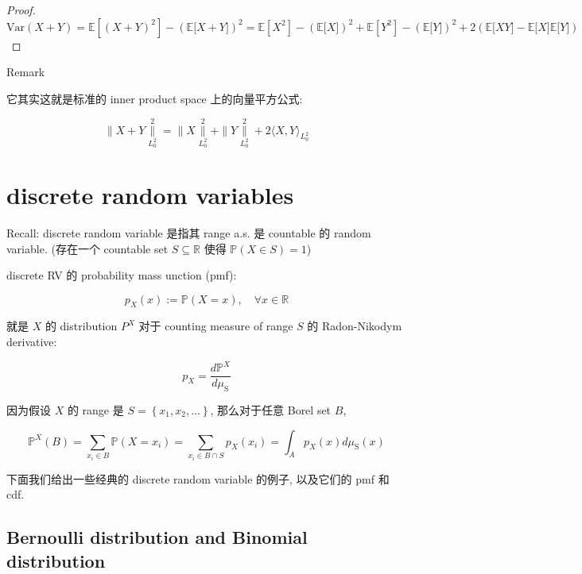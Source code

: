 \documentclass{qlnotes-export}
\begin{document}
\begin{proof}

\[\text{Var}(X + Y) = {\mathbb{E}}\left\lbrack {(X + Y)^{2}} \right\rbrack - ({\mathbb{E}}\lbrack X + Y\rbrack)^{2} = {\mathbb{E}}\left\lbrack X^{2} \right\rbrack - ({\mathbb{E}}\lbrack X\rbrack)^{2} + {\mathbb{E}}\left\lbrack Y^{2} \right\rbrack - ({\mathbb{E}}\lbrack Y\rbrack)^{2} + 2({\mathbb{E}}\lbrack XY\rbrack - {\mathbb{E}}\lbrack X\rbrack{\mathbb{E}}\lbrack Y\rbrack)\]

\end{proof}

\begin{qlremark}{Remark}

它其实这就是标准的 inner product space 上的向量平方公式:

\[\parallel X + Y\underset{L_{0}^{2}}{\overset{2}{\parallel}} = \parallel X\underset{L_{0}^{2}}{\overset{2}{\parallel}} + \parallel Y\underset{L_{0}^{2}}{\overset{2}{\parallel}} + 2\langle X,Y\rangle_{L_{0}^{2}}\]

\end{qlremark}

\section{discrete random variables}\label{discrete-random-variables}

Recall: discrete random variable 是指其 range a.s. 是 countable 的 random variable. (存在一个 countable set \(S \subseteq {\mathbb{R}}\) 使得 \({\mathbb{P}}(X \in S) = 1\))

discrete RV 的 probability mass unction (pmf):

\[p_{X}(x) := {\mathbb{P}}(X = x),\quad\forall x \in {\mathbb{R}}\]

就是 \(X\) 的 distribution \(P^{X}\) 对于 counting measure of range \(S\) 的 Radon-Nikodym derivative:

\[p_{X} = \frac{d{\mathbb{P}}^{X}}{d\mu_{\text{S}}}\]

因为假设 \(X\) 的 range 是 \(S = \left\{ {x_{1},x_{2},\ldots} \right\}\), 那么对于任意 Borel set \(B\),

\[{\mathbb{P}}^{X}(B) = \sum\limits_{x_{i} \in B}{\mathbb{P}}(X = x_{i}) = \sum\limits_{x_{i} \in B \cap S}p_{X}(x_{i}) = \int_{A}p_{X}(x) d\mu_{\text{S}}(x)\]

下面我们给出一些经典的 discrete random variable 的例子, 以及它们的 pmf 和 cdf.

\subsection{Bernoulli distribution and Binomial distribution}\label{bernoulli-distribution-and-binomial-distribution}
\end{document}
